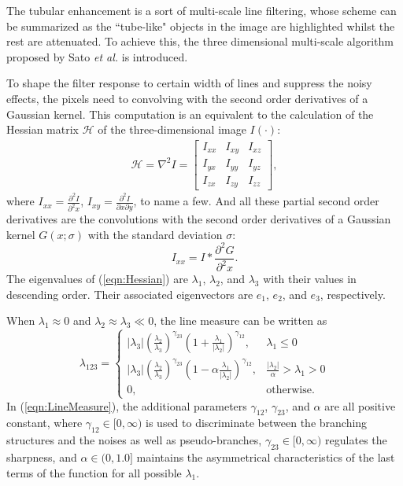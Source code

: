 The tubular enhancement is a sort of multi-scale line filtering, whose scheme can be summarized as the ``tube-like" objects in the image are highlighted whilst the rest are attenuated. %
To achieve this, the three dimensional multi-scale algorithm proposed by Sato \textit{et al.} \cite{Sato1998} is introduced.

To shape the filter response to certain width of lines and suppress the noisy effects, the pixels need to convolving with the second order derivatives of a Gaussian kernel.
This computation is an equivalent to the calculation of the Hessian matrix $\mathcal{H}$ of the three-dimensional image $I(\cdot)$:
\begin{gather}
\label{eqn:Hessian}
\mathcal{H} = \nabla^2 I =
\begin{bmatrix}
I_{xx} & I_{xy} & I_{xz} \\ I_{yx} & I_{yy} & I_{yz} \\ I_{zx} & I_{zy} & I_{zz}
\end{bmatrix},
\end{gather}
where $I_{xx} = \frac{\partial^2 I}{\partial^2 x}$, $I_{xy} = \frac{\partial^2 I}{\partial x \partial y}$, to name a few.
And all these partial second order derivatives are the convolutions with the second order derivatives of a Gaussian kernel $G(x; \sigma)$ with the standard deviation $\sigma$:
\begin{equation}
\label{GaussianConvolution}
I_{xx} = I \ast \frac{\partial^2 G}{\partial^2 x}.
\end{equation}
The eigenvalues of (\ref{eqn:Hessian}) are $\lambda_1$, $\lambda_2$, and $\lambda_3$ with their values in descending order.
Their associated eigenvectors are $e_1$, $e_2$, and $e_3$, respectively.

When $\lambda_1 \approx 0$ and $\lambda_2 \approx \lambda_3 \ll 0$, the line measure can be written as
\begin{equation}
\label{eqn:LineMeasure}
\lambda_{123} =
\begin{cases}
\left| \lambda_3 \right| \left( \frac{\lambda_2}{\lambda_3} \right)^{\gamma_{23}} \left( 1 + \frac{\lambda_1}{\left| \lambda_2 \right|} \right)^{\gamma_{12}}, & \lambda_1 \le 0 \\
\left| \lambda_3 \right| \left( \frac{\lambda_2}{\lambda_3} \right)^{\gamma_{23}} \left( 1 - \alpha \frac{\lambda_1}{\left| \lambda_2 \right|} \right)^{\gamma_{12}}, & \frac{\left| \lambda_2 \right|}{\alpha} > \lambda_1 > 0 \\
0, & \text{otherwise}.
\end{cases}
\end{equation}
In (\ref{eqn:LineMeasure}), the additional parameters $\gamma_{12}$, $\gamma_{23}$, and $\alpha$ are all positive constant, where $\gamma_{12} \in [0, \infty)$ is used to discriminate between the branching structures and the noises as well as pseudo-branches, $\gamma_{23} \in [0, \infty)$ regulates the sharpness, and $\alpha \in (0, 1.0]$ maintains the asymmetrical characteristics of the last terms of the function for all possible $\lambda_1$.

